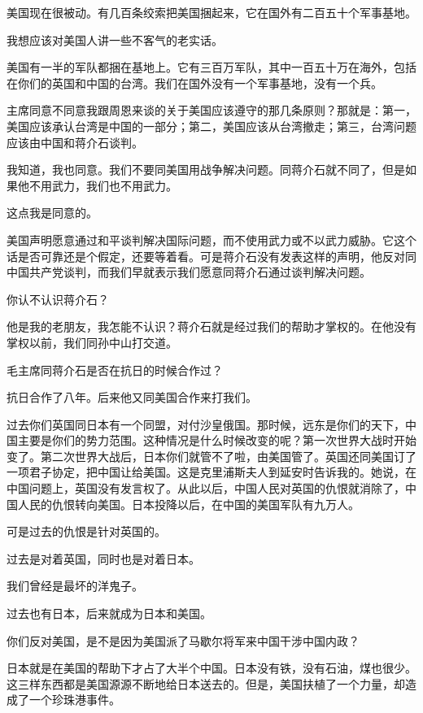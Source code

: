美国现在很被动。有几百条绞索把美国捆起来，它在国外有二百五十个军事基地。

我想应该对美国人讲一些不客气的老实话。

美国有一半的军队都捆在基地上。它有三百万军队，其中一百五十万在海外，包括在你们的英国和中国的台湾。我们在国外没有一个军事基地，没有一个兵。

主席同意不同意我跟周恩来谈的关于美国应该遵守的那几条原则？那就是：第一，美国应该承认台湾是中国的一部分；第二，美国应该从台湾撤走；第三，台湾问题应该由中国和蒋介石谈判。

我知道，我也同意。我们不要同美国用战争解决问题。同蒋介石就不同了，但是如果他不用武力，我们也不用武力。

这点我是同意的。

美国声明愿意通过和平谈判解决国际问题，而不使用武力或不以武力威胁。它这个话是否可靠还是个假定，还要等着看。可是蒋介石没有发表这样的声明，他反对同中国共产党谈判，而我们早就表示我们愿意同蒋介石通过谈判解决问题。

你认不认识蒋介石？

他是我的老朋友，我怎能不认识？蒋介石就是经过我们的帮助才掌权的。在他没有掌权以前，我们同孙中山打交道。

毛主席同蒋介石是否在抗日的时候合作过？

抗日合作了八年。后来他又同美国合作来打我们。

过去你们英国同日本有一个同盟，对付沙皇俄国。那时候，远东是你们的天下，中国主要是你们的势力范围。这种情况是什么时候改变的呢？第一次世界大战时开始变了。第二次世界大战后，日本你们就管不了啦，由美国管了。英国还同美国订了一项君子协定，把中国让给美国。这是克里浦斯夫人到延安时告诉我的。她说，在中国问题上，英国没有发言权了。从此以后，中国人民对英国的仇恨就消除了，中国人民的仇恨转向美国。日本投降以后，在中国的美国军队有九万人。

可是过去的仇恨是针对英国的。

过去是对着英国，同时也是对着日本。

我们曾经是最坏的洋鬼子。

过去也有日本，后来就成为日本和美国。

你们反对美国，是不是因为美国派了马歇尔将军来中国干涉中国内政？

日本就是在美国的帮助下才占了大半个中国。日本没有铁，没有石油，煤也很少。这三样东西都是美国源源不断地给日本送去的。但是，美国扶植了一个力量，却造成了一个珍珠港事件。

